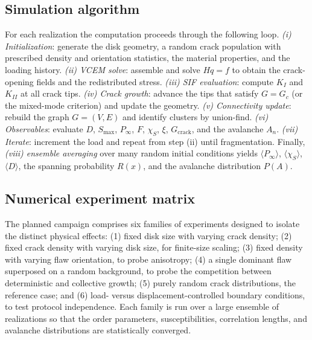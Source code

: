 \documentclass[preprint,12pt]{elsarticle}
\begin{document}
\subsection{Simulation algorithm}
\label{sec:algorithm}

For each realization the computation proceeds through the following loop.
\emph{(i) Initialization}: generate the disk geometry, a random crack population with
prescribed density and orientation statistics, the material properties, and the
loading history. \emph{(ii) VCEM solve}: assemble and solve $Hq=f$ to obtain the
crack-opening fields and the redistributed stress. \emph{(iii) SIF evaluation}:
compute $K_I$ and $K_{II}$ at all crack tips. \emph{(iv) Crack growth}: advance the
tips that satisfy $G=G_c$ (or the mixed-mode criterion) and update the geometry.
\emph{(v) Connectivity update}: rebuild the graph $G=(V,E)$ and identify clusters by
union-find. \emph{(vi) Observables}: evaluate $D$, $S_{\max}$, $P_\infty$, $F$,
$\chi_S$, $\xi$, $G_{\mathrm{crack}}$, and the avalanche $A_n$. \emph{(vii) Iterate}:
increment the load and repeat from step (ii) until fragmentation. Finally,
\emph{(viii) ensemble averaging} over many random initial conditions yields
$\langle P_\infty\rangle$, $\langle\chi_S\rangle$, $\langle D\rangle$, the spanning
probability $R(x)$, and the avalanche distribution $P(A)$.

\subsection{Numerical experiment matrix}
\label{sec:experiments}

The planned campaign comprises six families of experiments designed to isolate the
distinct physical effects: (1) fixed disk size with varying crack density; (2) fixed
crack density with varying disk size, for finite-size scaling; (3) fixed density with
varying flaw orientation, to probe anisotropy; (4) a single dominant flaw superposed
on a random background, to probe the competition between deterministic and collective
growth; (5) purely random crack distributions, the reference case; and (6) load-
versus displacement-controlled boundary conditions, to test protocol independence.
Each family is run over a large ensemble of realizations so that the order parameters,
susceptibilities, correlation lengths, and avalanche distributions are statistically
converged.
\end{document}
